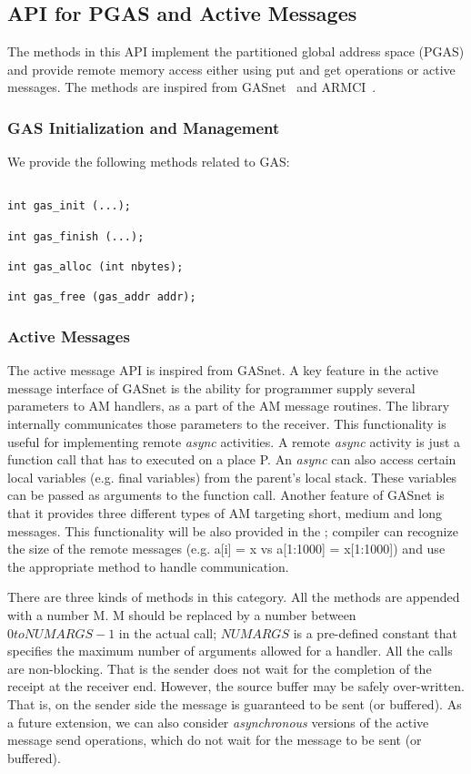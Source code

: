 \subsection{API for PGAS and Active Messages}
The methods in this API implement the partitioned global address
space (PGAS) and provide remote memory access either using
put and get operations or active messages. The methods are inspired
from GASnet~\cite{gasnet} and ARMCI~\cite{armci}. 

\subsubsection {GAS Initialization and Management}

We provide the following methods related to GAS:

\begin{verbatim}

int gas_init (...);

int gas_finish (...);

int gas_alloc (int nbytes);

int gas_free (gas_addr addr);

\end{verbatim}


\subsubsection {Active Messages}

The active message API is inspired from GASnet. A key feature in
the active message interface of GASnet is the ability for programmer
supply several parameters to AM handlers, as  a part of the
AM message routines. The library internally communicates those
parameters to the receiver. This functionality is useful for 
implementing remote {\em async} activities. A remote {\em async} activity is just
a function call that has to executed on a place P. An {\em async} can also
access certain local variables (e.g. final variables) from the parent's
local stack. These variables can be passed as arguments to the function call.
Another feature of GASnet is that it provides three different types of AM 
targeting short, medium and long messages. This functionality will be also
provided in the \Xtenlib{}; \Xten compiler can recognize the size of
the remote messages (e.g. a[i] = x vs a[1:1000] = x[1:1000]) and use the
appropriate method to handle communication. 

There are three kinds of methods in this category. All the methods are appended with a number
M. M should be replaced by a number between $0 to NUMARGS-1$ in the actual call; $NUMARGS$ is 
a pre-defined constant that specifies the maximum number of arguments allowed for a
handler. All the calls are non-blocking. That is the sender does not wait for the completion
of the receipt at the receiver end. However, the source buffer may be safely over-written.
That is, on the sender side the message is guaranteed to be sent (or buffered). As a future
extension, we can also consider {\em asynchronous} versions of the active message send
operations, which do not wait for the message to be sent (or buffered).

